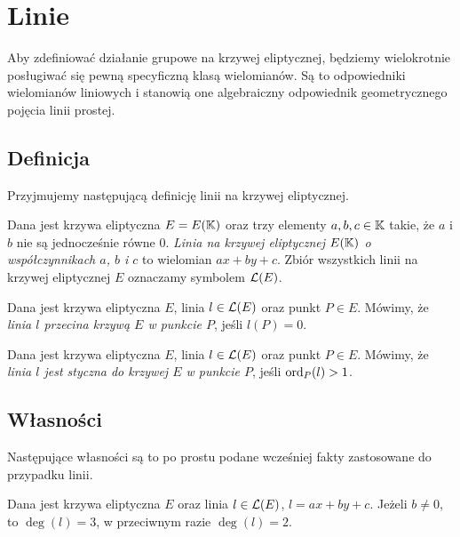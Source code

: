 \section{Linie}

Aby zdefiniować działanie grupowe na krzywej eliptycznej,
będziemy wielokrotnie posługiwać się
pewną specyficzną klasą wielomianów.
Są to odpowiedniki wielomianów liniowych
i stanowią one algebraiczny odpowiednik
geometrycznego pojęcia linii prostej.

\subsection*{Definicja}

Przyjmujemy następującą definicję linii na krzywej eliptycznej.

\begin{definition}
Dana jest krzywa eliptyczna $E = E(\mathbb{K})$
oraz trzy elementy $a, b, c \in \mathbb{K}$ takie,
że $a$ i $b$ nie są jednocześnie równe $0$.
\emph{Linia na krzywej eliptycznej $E(\mathbb{K})$ o współczynnikach $a$, $b$ i $c$}
to wielomian $ax + by + c$.
Zbiór wszystkich linii na krzywej eliptycznej $E$
oznaczamy symbolem $\mathcal{L}(E)$.
\end{definition}

\begin{definition}
Dana jest krzywa eliptyczna $E$,
linia $l \in \mathcal{L}(E)$
oraz punkt $P \in E$.
Mówimy, że \emph{linia $l$ przecina krzywą $E$ w punkcie $P$},
jeśli $l(P) = 0$.
\end{definition}

\begin{definition}
Dana jest krzywa eliptyczna $E$,
linia $l \in \mathcal{L}(E)$
oraz punkt $P \in E$.
Mówimy, że \emph{linia $l$ jest styczna do krzywej $E$ w punkcie $P$},
jeśli $\operatorname{ord}_P(l) > 1$.
\end{definition}

\subsection*{Własności}

Następujące własności są to po prostu podane wcześniej fakty
zastosowane do przypadku linii.

\begin{fact}\label{line_deg_fact}
Dana jest krzywa eliptyczna $E$
oraz linia $l \in \mathcal{L}(E)$, $l = ax + by + c$.
Jeżeli $b \neq 0$, to $\deg(l) = 3$,
w przeciwnym razie $\deg(l) = 2$.
\end{fact}

